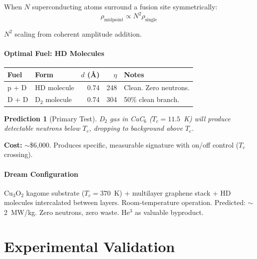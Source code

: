 \documentclass[11pt, a4paper]{article}
\newtheorem{prediction}{Prediction}[section]
\begin{document}
When $N$ superconducting atoms surround a fusion site symmetrically:
\begin{equation}
  \rho_{\text{midpoint}} \propto N^2 \rho_{\text{single}}
\end{equation}

$N^2$ scaling from coherent amplitude addition.

\subsection{Optimal Fuel: HD Molecules}

\begin{center}
\begin{tabular}{@{}llrrl@{}}
\toprule
\textbf{Fuel} & \textbf{Form} & \textbf{$d$ (\AA)} &
\textbf{$\eta$} & \textbf{Notes} \\
\midrule
p + D & HD molecule & 0.74 & 248 & Clean. Zero neutrons. \\
D + D & D$_2$ molecule & 0.74 & 304 & 50\% clean branch. \\
\bottomrule
\end{tabular}
\end{center}

\begin{prediction}[Primary Test]
D$_2$ gas in CaC$_6$ ($T_c = 11.5$~K) will produce detectable
neutrons below $T_c$, dropping to background above $T_c$.
\end{prediction}

\textbf{Cost:} $\sim$\$6,000. Produces specific, measurable
signature with on/off control ($T_c$ crossing).

\subsection{Dream Configuration}

Cu$_3$O$_2$ kagome substrate ($T_c = 370$~K) + multilayer graphene
stack + HD molecules intercalated between layers. Room-temperature
operation. Predicted: $\sim$2~MW/kg. Zero neutrons, zero waste.
He$^3$ as valuable byproduct.

\newpage

\part{Experimental Validation}
\end{document}
